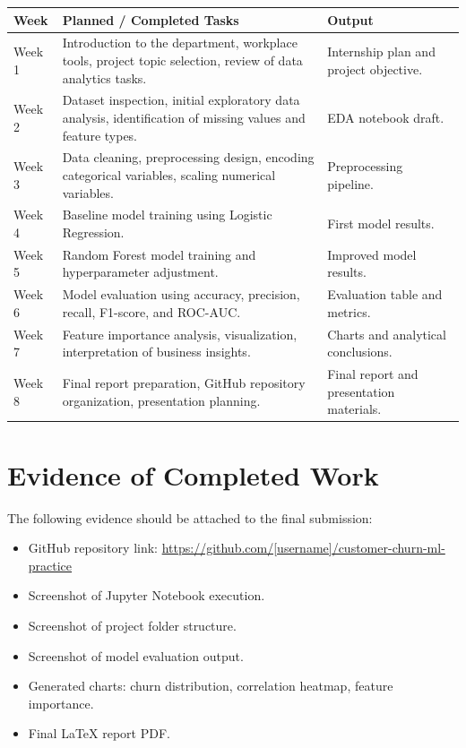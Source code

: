 \documentclass[12pt,a4paper]{article}
\begin{document}
\begin{longtable}{p{3cm}p{8cm}p{4cm}}
\toprule
\textbf{Week} & \textbf{Planned / Completed Tasks} & \textbf{Output} \\
\midrule
Week 1 & Introduction to the department, workplace tools, project topic selection, review of data analytics tasks. & Internship plan and project objective. \\
Week 2 & Dataset inspection, initial exploratory data analysis, identification of missing values and feature types. & EDA notebook draft. \\
Week 3 & Data cleaning, preprocessing design, encoding categorical variables, scaling numerical variables. & Preprocessing pipeline. \\
Week 4 & Baseline model training using Logistic Regression. & First model results. \\
Week 5 & Random Forest model training and hyperparameter adjustment. & Improved model results. \\
Week 6 & Model evaluation using accuracy, precision, recall, F1-score, and ROC-AUC. & Evaluation table and metrics. \\
Week 7 & Feature importance analysis, visualization, interpretation of business insights. & Charts and analytical conclusions. \\
Week 8 & Final report preparation, GitHub repository organization, presentation planning. & Final report and presentation materials. \\
\bottomrule
\end{longtable}

\section{Evidence of Completed Work}

The following evidence should be attached to the final submission:

\begin{itemize}
    \item GitHub repository link: \url{https://github.com/[username]/customer-churn-ml-practice}
    \item Screenshot of Jupyter Notebook execution.
    \item Screenshot of project folder structure.
    \item Screenshot of model evaluation output.
    \item Generated charts: churn distribution, correlation heatmap, feature importance.
    \item Final LaTeX report PDF.
\end{itemize}
\end{document}
